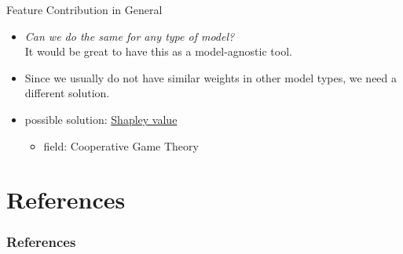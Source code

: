 \documentclass[dvipsnames]{beamer}
\newcommand{\red}[1]{{\color{red} #1}}
\begin{document}


\begin{frame}{Feature Contribution in General}
	\begin{itemize}
		\item \emph{Can we do the same for any type of model?}
		\\It would be great to have this as a model-agnostic tool.
		\item \red{Since we usually do not have similar weights in other model types, we need a different solution.}
		\item possible solution: \underline{Shapley value}
		\begin{itemize}
			\item field: Cooperative Game Theory
		\end{itemize}
	\end{itemize}
\end{frame}



\section{References}
\begin{frame}[allowframebreaks]
\frametitle{References}
\printbibliography
\end{frame}
\end{document}

